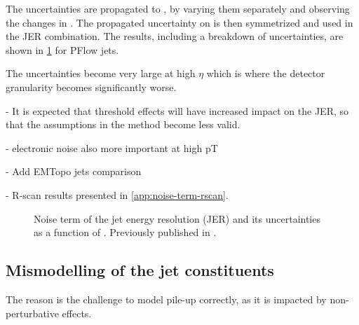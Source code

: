 The uncertainties are propagated to \Nfull, by varying them separately and observing the changes in \Nfull. The propagated uncertainty on \Nfull is then symmetrized and used in the JER combination. 
The results, including a breakdown of uncertainties, are shown in \cref{fig:noise-term-results-pflow} for PFlow jets.


%

The uncertainties become very large at high $\eta$ which is where the detector granularity becomes significantly worse.

- It is expected that threshold effects will have increased impact on the JER, so that the assumptions in the method become less valid. 

- electronic noise also more important at high pT

- Add EMTopo jets comparison

- R-scan results presented in \cref{app:noise-term-rscan}.







\begin{figure}
    \caption{Noise term of the jet energy resolution (JER) and its uncertainties as a function of \abseta. Previously published in .}
    \label{fig:noise-term-results-pflow}
\end{figure}




\subsection{Mismodelling of the jet constituents}
\label{subsec:constituents-mismodelling}
The reason is the challenge to model pile-up correctly, as it is impacted by non-perturbative effects.

